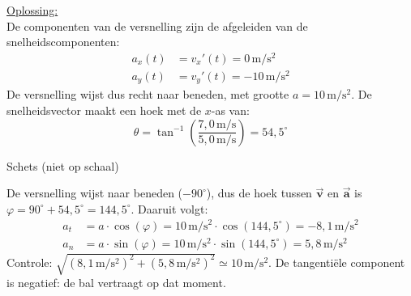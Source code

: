 \documentclass{ximera}
\begin{document}
\begin{exercise}
\begin{question}
\begin{solution}
            \underline{Oplossing:}\\
            De componenten van de versnelling zijn de afgeleiden van de snelheidscomponenten:
            \begin{align*}
                a_x(t) &= v_x'(t) = 0 \, \mathrm{m/s^2}\\
                a_y(t) &= v_y'(t) = -10 \, \mathrm{m/s^2}
            \end{align*}
            De versnelling wijst dus recht naar beneden, met grootte $a = 10 \, \mathrm{m/s^2}$. De snelheidsvector maakt een hoek met de $x$-as van:
            \[
                \theta = \tan^{-1}\left(\frac{7{,}0 \, \mathrm{m/s}}{5{,}0 \, \mathrm{m/s}}\right) = 54{,}5^\circ
            \]
            \begin{center}

                Schets (niet op schaal)
            \end{center}
            De versnelling wijst naar beneden ($-90^\circ$), dus de hoek tussen $\vec{\mathbf{v}}$ en $\vec{\mathbf{a}}$ is $\varphi = 90^\circ + 54{,}5^\circ = 144{,}5^\circ$. Daaruit volgt:
            \begin{align*}
                a_t &= a \cdot \cos(\varphi) = 10 \, \mathrm{m/s^2} \cdot \cos(144{,}5^\circ) = \boxed{-8{,}1 \, \mathrm{m/s^2}}\\
                a_n &= a \cdot \sin(\varphi) = 10 \, \mathrm{m/s^2} \cdot \sin(144{,}5^\circ) = \boxed{5{,}8 \, \mathrm{m/s^2}}
            \end{align*}
            Controle: $\sqrt{(8{,}1 \, \mathrm{m/s^2})^{2} + (5{,}8 \, \mathrm{m/s^2})^{2}} \simeq 10 \, \mathrm{m/s^2}$. De tangentiële component is negatief: de bal vertraagt op dat moment.
        \end{solution}
    \end{question}


\end{exercise}
\end{document}
